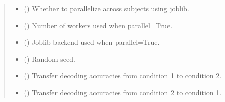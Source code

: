 \documentclass[letterpaper,10pt,english]{sphinxhowto}
\begin{document}
\begin{fulllineitems}
\begin{quote}
\begin{description}
\begin{itemize}
\item {} 
\sphinxAtStartPar
{} (\sphinxstyleliteralemphasis{\sphinxupquote{, }}) \textendash{} Whether to parallelize across subjects using joblib.

\item {} 
\sphinxAtStartPar
{} (\sphinxstyleliteralemphasis{\sphinxupquote{, }}) \textendash{} Number of workers used when parallel=True.

\item {} 
\sphinxAtStartPar
{} (\sphinxstyleliteralemphasis{\sphinxupquote{, }}\sphinxstyleliteralemphasis{\sphinxupquote{, }}) \textendash{} Joblib backend used when parallel=True.

\item {} 
\sphinxAtStartPar
{} (\sphinxstyleliteralemphasis{\sphinxupquote{, }}) \textendash{} Random seed.

\end{itemize}

\sphinxAtStartPar
\begin{itemize}
\item {} 
\sphinxAtStartPar
{} () \textendash{} Transfer decoding accuracies from condition 1 to condition 2.

\item {} 
\sphinxAtStartPar
{} () \textendash{} Transfer decoding accuracies from condition 2 to condition 1.

\end{itemize}


\end{description}\end{quote}

\end{fulllineitems}
\end{document}
